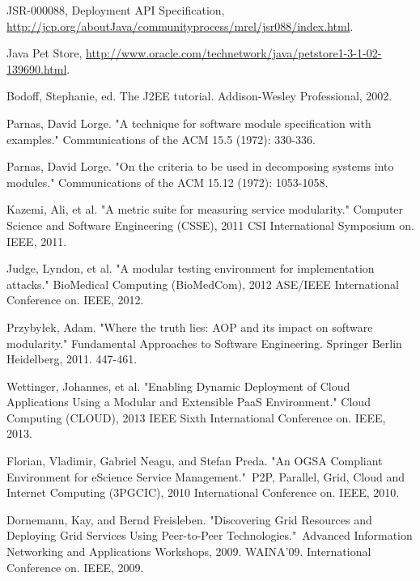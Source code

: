 \documentclass[conference]{IEEEtran}
\begin{document}
\begin{thebibliography}{9}

JSR-000088, Deployment API Specification, \url{http://jcp.org/aboutJava/communityprocess/mrel/jsr088/index.html}.

Java Pet Store, \url{http://www.oracle.com/technetwork/java/petstore1-3-1-02-139690.html}.

Bodoff, Stephanie, ed. The J2EE tutorial. Addison-Wesley Professional, 2002.



Parnas, David Lorge. "A technique for software module specification with examples." Communications of the ACM 15.5 (1972): 330-336.

Parnas, David Lorge. "On the criteria to be used in decomposing systems into modules." Communications of the ACM 15.12 (1972): 1053-1058.

Kazemi, Ali, et al. "A metric suite for measuring service modularity." Computer Science and Software Engineering (CSSE), 2011 CSI International Symposium on. IEEE, 2011.

Judge, Lyndon, et al. "A modular testing environment for implementation attacks." BioMedical Computing (BioMedCom), 2012 ASE/IEEE International Conference on. IEEE, 2012.

Przybyłek, Adam. "Where the truth lies: AOP and its impact on software modularity." Fundamental Approaches to Software Engineering. Springer Berlin Heidelberg, 2011. 447-461.

Wettinger, Johannes, et al. "Enabling Dynamic Deployment of Cloud Applications Using a Modular and Extensible PaaS Environment." Cloud Computing (CLOUD), 2013 IEEE Sixth International Conference on. IEEE, 2013.

Florian, Vladimir, Gabriel Neagu, and Stefan Preda. "An OGSA Compliant Environment for eScience Service Management." P2P, Parallel, Grid, Cloud and Internet Computing (3PGCIC), 2010 International Conference on. IEEE, 2010.

Dornemann, Kay, and Bernd Freisleben. "Discovering Grid Resources and Deploying Grid Services Using Peer-to-Peer Technologies." Advanced Information Networking and Applications Workshops, 2009. WAINA'09. International Conference on. IEEE, 2009.


\end{thebibliography}
\end{document}
